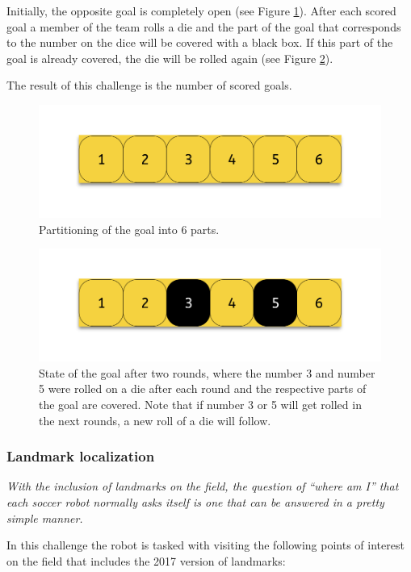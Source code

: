 \documentclass{article}
\begin{document}
Initially, the opposite goal is completely open (see Figure
\ref{fig:goal_parts}). After each
scored goal a member of the team rolls a die and the part of the goal that
corresponds to the number on the dice will be covered with a black box. If
this part of the goal is already covered, the die will be rolled again (see
Figure \ref{fig:goal_parts_filled}).

The result of this challenge is the number of scored goals.

\begin{figure}
  \centering
  \includegraphics[width=.9\linewidth]{media/goal_parts}
  \caption{Partitioning of the goal into 6 parts.}
  \label{fig:goal_parts}
\end{figure}%
\begin{figure}
  \centering
  \includegraphics[width=.9\linewidth]{media/goal_parts_filled}
  \caption{State of the goal after two rounds, where the number 3 and number 5
      were rolled on a die after each round and the respective parts of the
      goal are covered. Note that if number 3 or 5 will get rolled in the next
      rounds, a new roll of a die will follow.}
  \label{fig:goal_parts_filled}
\end{figure}

\subsubsection{Landmark localization}

\textit{With the inclusion of landmarks on the field, the
question of “where am I” that each soccer robot normally asks itself is
one that can be answered in a pretty simple manner.}

In this challenge the robot is tasked with visiting the
    following points of interest on the field that includes the 2017 version of
    landmarks:
\end{document}
